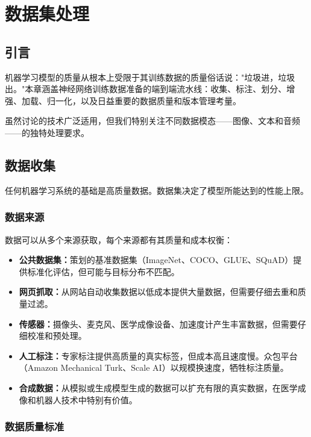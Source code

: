 \clearpage
\cleardoublepage

\chapter{数据集处理}

\section{引言}

机器学习模型的质量从根本上受限于其训练数据的质量俗话说："垃圾进，垃圾出。"本章涵盖神经网络训练数据准备的端到端流水线：收集、标注、划分、增强、加载、归一化，以及日益重要的数据质量和版本管理考量。

虽然讨论的技术广泛适用，但我们特别关注不同数据模态——图像、文本和音频——的独特处理要求。

\section{数据收集}

任何机器学习系统的基础是高质量数据。数据集决定了模型所能达到的性能上限。

\subsection{数据来源}

数据可以从多个来源获取，每个来源都有其质量和成本权衡：

\begin{itemize}
    \item \textbf{公共数据集：}策划的基准数据集（ImageNet、COCO、GLUE、SQuAD）提供标准化评估，但可能与目标分布不匹配。
    \item \textbf{网页抓取：}从网站自动收集数据以低成本提供大量数据，但需要仔细去重和质量过滤。
    \item \textbf{传感器：}摄像头、麦克风、医学成像设备、加速度计产生丰富数据，但需要仔细校准和预处理。
    \item \textbf{人工标注：}专家标注提供高质量的真实标签，但成本高且速度慢。众包平台（Amazon Mechanical Turk、Scale AI）以规模换速度，牺牲标注质量。
    \item \textbf{合成数据：}从模拟或生成模型生成的数据可以扩充有限的真实数据，在医学成像和机器人技术中特别有价值。
\end{itemize}

\subsection{数据质量标准}

